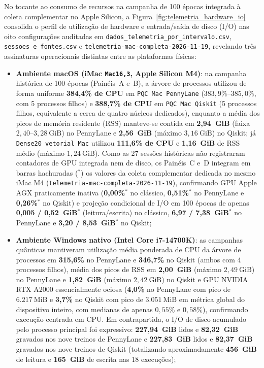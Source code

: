 \documentclass[
    12pt,
    openright,
    oneside,
    a4paper,
    english,
    brazil
]{abntex2}
\begin{document}
No tocante ao consumo de recursos na campanha de 100 épocas integrada à coleta complementar no Apple Silicon, a Figura~\ref{fig:telemetria_hardware_io} consolida o perfil de utilização de hardware e entrada/saída de disco (I/O) nas oito configurações auditadas em \texttt{dados\_telemetria\_\allowbreak por\_intervalo.csv}, \texttt{sessoes\_e\_\allowbreak fontes.csv} e \texttt{telemetria-mac-\allowbreak completa-2026-11-19}, revelando três assinaturas operacionais distintas entre as plataformas físicas:
\begin{itemize}
    \item \textbf{Ambiente macOS (iMac \texttt{Mac16,3}, Apple Silicon M4)}: na campanha histórica de 100 épocas (Painéis~A e~B), a árvore de processos utilizou de forma uniforme \textbf{384,4\% de CPU} em \texttt{PQC Mac PennyLane} (\(383{,}9\%\)--\(385{,}0\%\), com 5 processos filhos) e \textbf{388,7\% de CPU} em \texttt{PQC Mac Qiskit} (5 processos filhos, equivalente a cerca de quatro núcleos dedicados), enquanto a média dos picos de memória residente (RSS) manteve-se contida em \textbf{2,94~GiB} (faixa \(2{,}40\)--\(3{,}28~\text{GiB}\)) no PennyLane e \textbf{2,56~GiB} (máximo \(3{,}16~\text{GiB}\)) no Qiskit; já \texttt{Dense20 vetorial Mac} utilizou \textbf{111,6\% de CPU} e \textbf{1,16~GiB} de RSS médio (máximo \(1{,}24~\text{GiB}\)). Como as 27 sessões históricas não registraram contadores de GPU integrada nem de disco, os Painéis~C e~D integram em barras hachuradas (\(^\ast\)) os valores da coleta complementar dedicada no mesmo iMac M4 (\texttt{telemetria-mac-\allowbreak completa-2026-11-19}), confirmando GPU Apple AGX praticamente inativa (\textbf{0,00\%\(^\ast\)} no clássico, \textbf{0,51\%\(^\ast\)} no PennyLane e \textbf{0,26\%\(^\ast\)} no Qiskit) e projeção condicional de I/O em 100 épocas de apenas \textbf{0,005 / 0,52~GiB\(^\ast\)} (leitura/escrita) no clássico, \textbf{6,97 / 7,38~GiB\(^\ast\)} no PennyLane e \textbf{3,20 / 8,53~GiB\(^\ast\)} no Qiskit;
    \item \textbf{Ambiente Windows nativo (Intel Core i7-14700K)}: as campanhas quânticas mantiveram utilização média ponderada de CPU da árvore de processos em \textbf{315,6\%} no PennyLane e \textbf{346,7\%} no Qiskit (ambos com 4 processos filhos), média dos picos de RSS em \textbf{2,00~GiB} (máximo \(2{,}49~\text{GiB}\)) no PennyLane e \textbf{1,82~GiB} (máximo \(2{,}42~\text{GiB}\)) no Qiskit e GPU NVIDIA RTX A2000 essencialmente ociosa (\textbf{4,0\%} no PennyLane com pico de \(6.217~\text{MiB}\) e \textbf{3,7\%} no Qiskit com pico de \(3.051~\text{MiB}\) em métrica global do dispositivo inteiro, com medianas de apenas \(0{,}55\%\) e \(0{,}58\%\)), confirmando execução centrada em CPU. Em contrapartida, o I/O de disco acumulado pelo processo principal foi expressivo: \textbf{227,94~GiB} lidos e \textbf{82,32~GiB} gravados nos nove treinos de PennyLane e \textbf{227,83~GiB} lidos e \textbf{82,37~GiB} gravados nos nove treinos de Qiskit (totalizando aproximadamente \textbf{456~GiB} de leitura e \textbf{165~GiB} de escrita nas 18 execuções);

\end{itemize}
\end{document}
